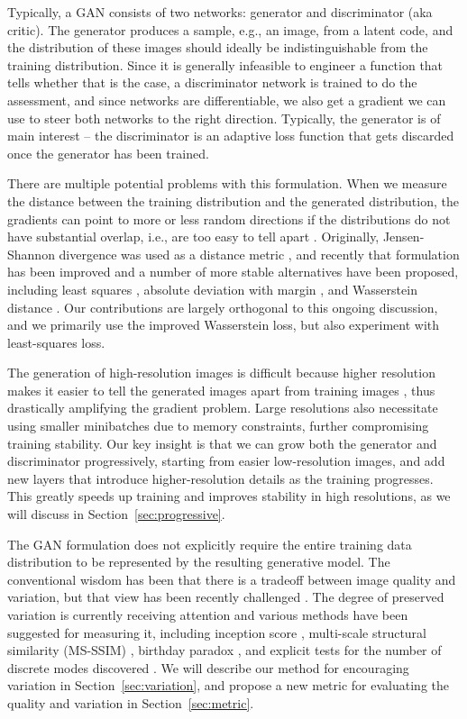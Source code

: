 \documentclass{article}
\begin{document}
Typically, a GAN consists of two networks: generator and discriminator (aka critic). The generator produces a sample, e.g., an image, from a latent code, and the distribution of these images should ideally be indistinguishable from the training distribution. Since it is generally infeasible to engineer a function that tells whether that is the case, a discriminator network is trained to do the assessment, and since networks are differentiable, we also get a gradient we can use to steer both networks to the right direction. Typically, the generator is of main interest -- the discriminator is an adaptive loss function that gets discarded once the generator has been trained.

There are multiple potential problems with this formulation. When we measure the distance between the training distribution and the generated distribution, the gradients can point to more or less random directions if the distributions do not have substantial overlap, i.e., are too easy to tell apart \citep{Arjovsky2017A}. Originally, Jensen-Shannon divergence was used as a distance metric \citep{Goodfellow2014}, and recently that formulation has been improved \citep{Hjelm2017} and a number of more stable alternatives have been proposed, including least squares \citep{Mao2016}, absolute deviation with margin \citep{Zhao2016}, and Wasserstein distance \citep{Arjovsky2017,Gulrajani2017}. Our contributions are largely orthogonal to this ongoing discussion, and we primarily use the improved Wasserstein loss, but also experiment with least-squares loss.

The generation of high-resolution images is difficult because higher resolution makes it easier to tell the generated images apart from training images \citep{Odena2017}, thus drastically amplifying the gradient problem. %
Large resolutions also necessitate using smaller minibatches due to memory constraints, further compromising training stability. %
Our key insight is that we can grow both the generator and discriminator progressively, starting from easier low-resolution images, and add new layers that introduce higher-resolution details as the training progresses. This greatly speeds up training and improves stability in high resolutions, as we will discuss in Section~\ref{sec:progressive}.

The GAN formulation does not explicitly require the entire training data distribution to be represented by the resulting generative model. The conventional wisdom has been that there is a tradeoff between image quality and variation, but that view has been recently challenged \citep{Odena2017}. The degree of preserved variation is currently receiving attention and various methods have been suggested for measuring it, including inception score \citep{Salimans2016B}, multi-scale structural similarity (MS-SSIM) \citep{Odena2017,Wang2003}, birthday paradox \citep{Arora2017b}, and explicit tests for the number of discrete modes discovered \citep{Metz2016}. We will describe our method for encouraging variation in Section~\ref{sec:variation}, and propose a new metric for evaluating the quality and variation in Section~\ref{sec:metric}.  
\end{document}
